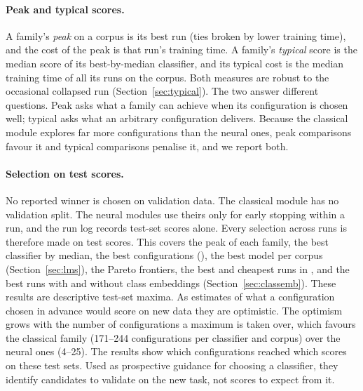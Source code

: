 \documentclass{ijis}
\begin{document}
\paragraph{Peak and typical scores.} A family's \emph{peak} on a corpus is its best run (ties broken by lower training time), and the cost of the peak is that run's training time. A family's \emph{typical} score is the median score of its best-by-median classifier, and its typical cost is the median training time of all its runs on the corpus. Both measures are robust to the occasional collapsed run (Section~\ref{sec:typical}). The two answer different questions. Peak asks what a family can achieve when its configuration is chosen well; typical asks what an arbitrary configuration delivers. Because the classical module explores far more configurations than the neural ones, peak comparisons favour it and typical comparisons penalise it, and we report both.

\paragraph{Selection on test scores.} No reported winner is chosen on validation data. The classical module has no validation split. The neural modules use theirs only for early stopping within a run, and the run log records test-set scores alone. Every selection across runs is therefore made on test scores. This covers the peak of each family, the best classifier by median, the best configurations (), the best model per corpus (Section~\ref{sec:lms}), the Pareto frontiers, the best and cheapest runs in , and the best runs with and without class embeddings (Section~\ref{sec:classemb}). These results are descriptive test-set maxima. As estimates of what a configuration chosen in advance would score on new data they are optimistic. The optimism grows with the number of configurations a maximum is taken over, which favours the classical family (171--244 configurations per classifier and corpus) over the neural ones (4--25). The results show which configurations reached which scores on these test sets. Used as prospective guidance for choosing a classifier, they identify candidates to validate on the new task, not scores to expect from it.
\end{document}

